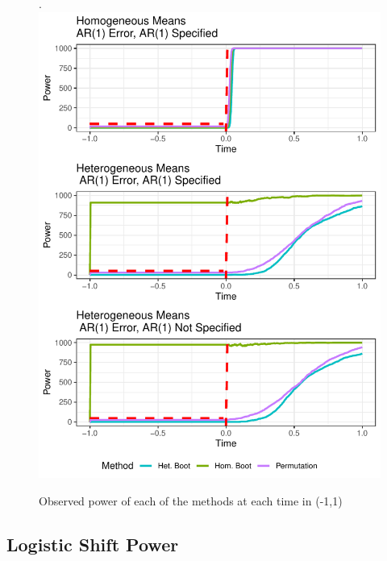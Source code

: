 \documentclass{article}
\begin{document}
\begin{figure}[H]
\centering.
\includegraphics{typeII_time.pdf}
\caption{Observed power of each of the methods at each time in (-1,1)}
\label{fig:time_power_plot}
\end{figure}


\subsection{Logistic Shift Power}
\end{document}

